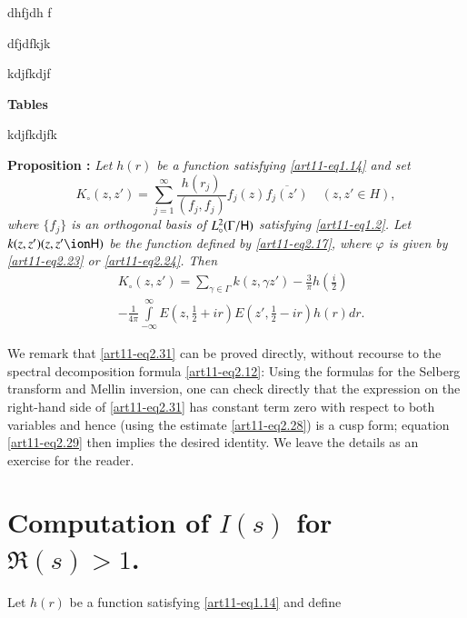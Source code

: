 

\begin{thebibliography}{99}
 dhfjdh f

 dfjdfkjk 

 kdjfkdjf 


\begin{center}
{\bf Tables}
\end{center}

 kdjfkdjfk 
\end{thebibliography}

\medskip
\noindent
{\bfseries Proposition :\label{art11-prop3}}
\textit{Let $h(r)$ be a function satisfying \eqref{art11-eq1.14} and set}
\begin{equation*}
K_\circ (z, z') = \sum\limits^\infty_{j=1} \frac{h(r_j)}{(f_j, f_j)} f_j (z) \overline{f_j (z')} \quad (z, z' \in H), 
\tag{2.30}\label{art11-eq2.30}
\end{equation*}
\textit{where $\{f_j\}$ is an orthogonal basis of $L^2_\circ (\Gamma / \mathsf{H})$ satisfying \eqref{art11-eq1.2}. Let $k(z,z') (z, z' \ion \sfH)$ be the function defined by \eqref{art11-eq2.17}, where $\varphi$ is given by \eqref{art11-eq2.23} or \eqref{art11-eq2.24}. Then}  
\begin{align*}
& K_\circ (z,z') =\sum\limits_{\gamma \in \Gamma} k (z, \gamma z') - \frac{3}{\pi} h (\frac{i}{2}) \tag{2.31} \label{art11-2.31}\\
& -\frac{1}{4\pi} \int\limits^\infty_{-\infty} E (z, \frac{1}{2} + ir) E (z', \frac{1}{2} - ir) h (r) dr. 
\end{align*}

We remark that \eqref{art11-eq2.31} can be proved directly, without recourse to the spectral decomposition formula \eqref{art11-eq2.12}: Using the formulas for the Selberg transform and Mellin inversion, one can check directly that the expression on the right-hand side of \eqref{art11-eq2.31} has constant term zero with respect to both variables and hence (using the estimate \eqref{art11-eq2.28}) is a cusp form; equation \eqref{art11-eq2.29} then implies the desired identity. We leave the details as an exercise for the reader. 

\section{Computation of $I(s)$ for $\Re (s) >1$.}\label{art11-sec3}
Let $h(r)$ be a function satisfying \eqref{art11-eq1.14} and define 







